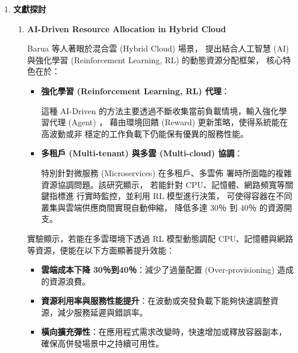 \documentclass[12pt,a4paper]{article}
\begin{document}
\begin{enumerate}[label={(\zhdig*)}, leftmargin=2\parindent, listparindent=\parindent]
\begin{enumerate}[label={(\arabic*)}, leftmargin=\parindent, listparindent=\parindent]
\begin{enumerate}[label={(\zhdig*)}, leftmargin=\parindent, listparindent=\parindent]
\end{enumerate}

\item \textbf{文獻探討}

    \begin{enumerate}[label={(\zhdig*)}, leftmargin=\parindent, listparindent=\parindent]

\item \textbf{AI-Driven Resource Allocation in Hybrid Cloud\cite{22}}

Barua 等人著眼於混合雲 (Hybrid Cloud) 場景，
提出結合人工智慧 (AI) 與強化學習
(Reinforcement Learning, RL)
的動態資源分配框架，
核心特色在於：

    \begin{itemize}[leftmargin=\parindent, listparindent=\parindent]

\item \textbf{強化學習 (Reinforcement Learning, RL) 代理}：

這種 AI-Driven 的方法主要透過不斷收集當前負載情境，輸入強化學習代理 (Agent) ，
藉由環境回饋 (Reward) 更新策略，使得系統能在高波動或非
穩定的工作負載下仍能保有優異的服務性能。

\item \textbf{多租戶 (Multi-tenant) 與多雲 (Multi-cloud) 協調}：

特別針對微服務 (Microservices) 在多租戶、多雲佈
署時所面臨的複雜資源協調問題。該研究顯示，
若能針對 CPU、記憶體、網路頻寬等關鍵指標進
行實時監控，並利用 RL 模型進行決策，
可使得容器在不同叢集與雲端供應商間實現自動伸縮，
降低多達 30％ 到 40％ 的資源開支。

\end{itemize}

實驗顯示，若能在多雲環境下透過 RL 模型動態調配 CPU、記憶體與網路等資源，便能在以下方面顯著提升效能：
    \begin{itemize}[leftmargin=\parindent, listparindent=\parindent]

        \item \textbf{雲端成本下降 30％到40％}：減少了過量配置 (Over-provisioning) 造成的資源浪費。

        \item \textbf{資源利用率與服務性能提升}：在波動或突發負載下能夠快速調整資源，減少服務延遲與錯誤率。

        \item \textbf{橫向擴充彈性}：在應用程式需求改變時，快速增加或釋放容器副本，確保高併發場景中之持續可用性。
\end{itemize}


\end{enumerate}
\end{enumerate}
\end{enumerate}
\end{document}
